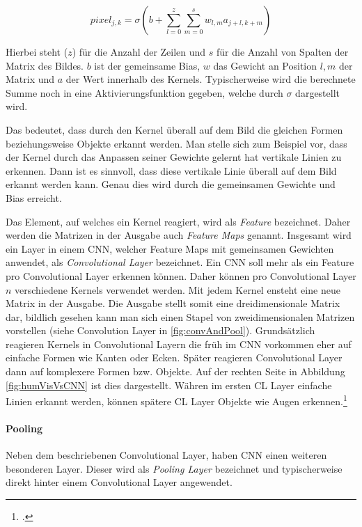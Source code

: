 \begin{equation}
    \label{eq:actSharedWeights}
    pixel_{j,k} = \sigma\left(b+\sum_{l=0}^{z} \sum_{m=0}^{s} w_{l, m} a_{j+l, k+m}\right)
\end{equation}

Hierbei steht ($z$) für die Anzahl der Zeilen und $s$ für die Anzahl von Spalten der Matrix des Bildes. $b$ ist der gemeinsame Bias, $w$ das Gewicht an Position $l,m$ der Matrix und $a$ der Wert innerhalb des Kernels. Typischerweise wird die berechnete Summe noch in eine Aktivierungsfunktion gegeben, welche durch $\sigma$ dargestellt wird.

Das bedeutet, dass durch den Kernel überall auf dem Bild die gleichen Formen beziehungsweise Objekte erkannt werden. Man stelle sich zum Beispiel vor, dass der Kernel durch das Anpassen seiner Gewichte gelernt hat vertikale Linien zu erkennen. Dann ist es sinnvoll, dass diese vertikale Linie überall auf dem Bild erkannt werden kann. Genau dies wird durch die gemeinsamen Gewichte und Bias erreicht.

Das Element, auf welches ein Kernel reagiert, wird als \textit{Feature} bezeichnet. Daher werden die Matrizen in der Ausgabe auch \textit{Feature Maps} genannt. Insgesamt wird ein Layer in einem \ac{CNN}, welcher Feature Maps mit gemeinsamen Gewichten anwendet, als \textit{Convolutional Layer} bezeichnet. Ein \ac{CNN} soll mehr als ein Feature pro Convolutional Layer erkennen können. Daher können pro Convolutional Layer $n$ verschiedene Kernels verwendet werden. Mit jedem Kernel ensteht eine neue Matrix in der Ausgabe. Die Ausgabe stellt somit eine dreidimensionale Matrix dar, bildlich gesehen kann man sich einen Stapel von zweidimensionalen Matrizen vorstellen (siehe Convolution Layer in \ref{fig:convAndPool}).
Grundsätzlich reagieren Kernels in Convolutional Layern die früh im \ac{CNN} vorkommen eher auf einfache Formen wie Kanten oder Ecken. Später reagieren Convolutional Layer dann auf komplexere Formen bzw. Objekte. Auf der rechten Seite in Abbildung \ref{fig:humVisVsCNN} ist dies dargestellt. Währen im ersten CL Layer einfache Linien erkannt werden, können spätere CL Layer Objekte wie Augen erkennen.\footcite[Vgl.][S. 169-171]{nielsenNeuralNetworksDeep2015}

\paragraph{Pooling}
Neben dem beschriebenen Convolutional Layer, haben \ac{CNN} einen weiteren besonderen Layer. Dieser wird als \textit{Pooling Layer} bezeichnet und typischerweise direkt hinter einem Convolutional Layer angewendet. 

